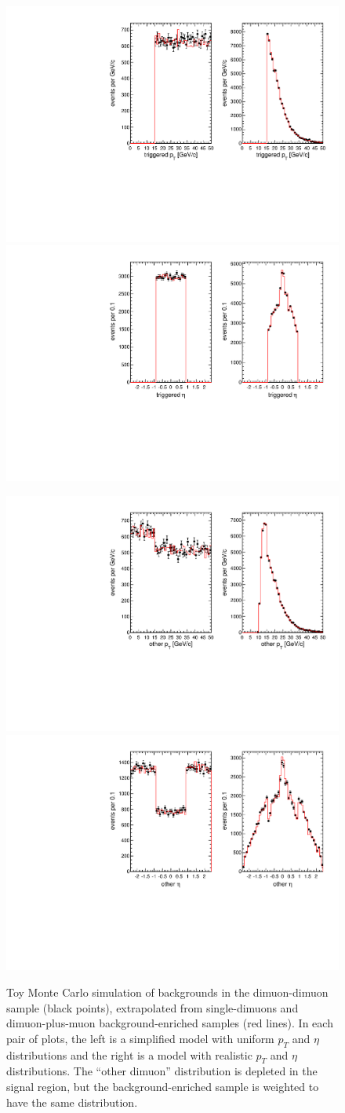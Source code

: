 \documentclass[12pt]{cms-tdr}
\begin{document}
\begin{figure}
\includegraphics[width=0.47\linewidth]{PLOTS/simulation_triggeredpt.pdf} \hfill
\includegraphics[width=0.47\linewidth]{PLOTS/simulation_triggeredeta.pdf}

\vspace{0.75 cm}
\includegraphics[width=0.47\linewidth]{PLOTS/simulation_otherpt.pdf} \hfill
\includegraphics[width=0.47\linewidth]{PLOTS/simulation_othereta.pdf}

\caption{Toy Monte Carlo simulation of backgrounds in the dimuon-dimuon sample
  (black points), extrapolated from single-dimuons and
  dimuon-plus-muon background-enriched samples (red lines).  In each pair of plots, the
  left is a simplified model with uniform $p_T$ and $\eta$
  distributions and the right is a model with realistic $p_T$ and
  $\eta$ distributions.  The ``other dimuon'' distribution is
  depleted in the signal region, but the background-enriched sample
  is weighted to have the same distribution. \label{fig:simulation_pteta}}
\end{figure}
\end{document}
